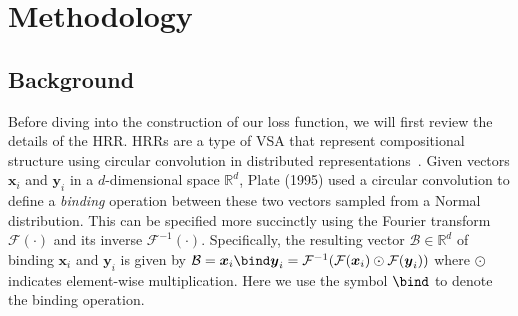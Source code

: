 \documentclass[letterpaper]{article} %
\begin{document}
\section{Methodology} \label{sec:method}


\subsection{Background}
Before diving into the construction of our loss function, we will first review the details of the HRR. HRRs are a type of VSA that represent compositional structure using circular convolution in distributed representations~\cite{b2}. Given vectors $\boldsymbol{x}_i$ and $\boldsymbol{y}_i$ in a $d$-dimensional space $\mathbb{R}^d$, Plate (1995) used a circular convolution to define a \emph{binding} operation between these two vectors sampled from a Normal distribution. This can be specified more succinctly using the Fourier transform $\mathcal{F}(\cdot)$ and its inverse $\mathcal{F}^{-1}(\cdot)$. Specifically, the resulting vector $\mathcal{B} \in \mathbb{R}^d$ of binding $\boldsymbol{x}_i$ and $\boldsymbol{y}_i$ is given by 
$\mathcal{B} = \boldsymbol{x}_i \bind \boldsymbol{y}_i = \mathcal{F}^{-1}(\mathcal{F}(\boldsymbol{x}_i) \odot \mathcal{F}(\boldsymbol{y}_i))$
where $\odot$ indicates element-wise multiplication.
Here we use the symbol $\bind $ to denote the binding operation. 
\end{document}
